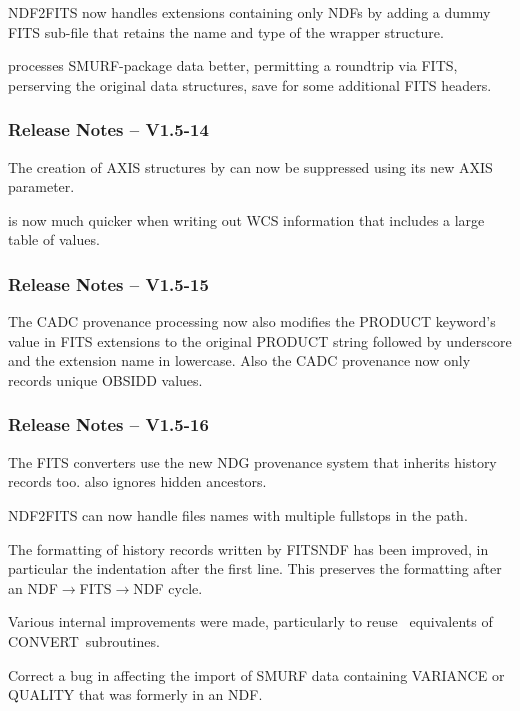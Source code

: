 \documentclass[twoside,11pt]{starlink}
\providecommand{\CONVERT}{{\footnotesize CONVERT}}
\providecommand{\KAPLIBS}{{\footnotesize KAPLIBS}}
\providecommand{\KAPLIBSref}{\xref{\KAPLIBS}{sun238}{}}
\begin{document}
NDF2FITS now handles extensions containing only NDFs by adding a dummy
FITS sub-file that retains the name and type of the wrapper
structure.

 processes SMURF-package data
better, permitting a roundtrip via FITS, perserving the original
data structures, save for some additional FITS headers.

\subsubsection{Release Notes -- V1.5-14}

The creation of AXIS structures by  can
now be suppressed using its new AXIS parameter.

 is now much quicker when writing out WCS
information that includes a large table of values.

\subsubsection{Release Notes -- V1.5-15}

The CADC provenance processing now also modifies the PRODUCT keyword's
value in FITS extensions to the original PRODUCT string followed by
underscore and the extension name in lowercase.  Also the CADC
provenance now only records unique OBSIDD values.

\subsubsection{Release Notes -- V1.5-16}

The FITS converters use the new NDG provenance system that inherits
history records too.   also ignores hidden
ancestors.

NDF2FITS can now handle files names with multiple fullstops in the
path.

The formatting of history records written by FITSNDF has been
improved, in particular the indentation after the first line. This
preserves the formatting after an NDF$\rightarrow$FITS$\rightarrow$NDF cycle.

Various internal improvements were made, particularly to reuse
\KAPLIBSref\ equivalents of \CONVERT\ subroutines.

Correct a bug in  affecting the import of
SMURF data containing VARIANCE or QUALITY that was formerly in an NDF.
\end{document}
